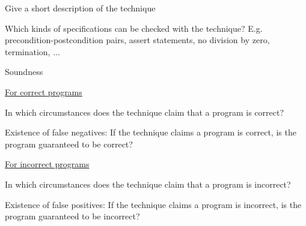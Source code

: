 \documentclass[a4paper]{article}
\begin{document}
\begin{minipage}[t]{0.16\linewidth}
	\raggedright
	\begin{betterlist}
		\item Give a short description of the technique
		\item Which kinds of specifications can be checked with the technique? E.g. precondition-postcondition pairs, assert statements, no division by zero, termination, ...

		\item \alert{Soundness}
		\begin{betterlist}
			\item \underline{For correct programs}
			\begin{betterlist}
				\item In which circumstances does the technique claim that a program is correct?

				\item Existence of false negatives: If the technique claims a program is correct, is the program guaranteed to be correct?

			\end{betterlist}
			\item \underline{For incorrect programs}
			\begin{betterlist}
				\item In which circumstances does the technique claim that a program is incorrect?

				\framebox[0.90\textwidth][l]{\parbox{0.85\textwidth}{
						\begin{betterlist}
							\item TODO
						\end{betterlist}
					}}
				\item Existence of false positives: If the technique claims a program is incorrect, is the program guaranteed to be incorrect?


\end{betterlist}
\end{betterlist}
\end{betterlist}
\end{minipage}
\end{document}
